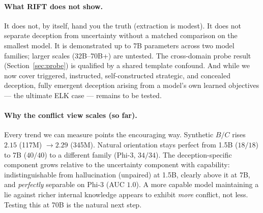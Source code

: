 \documentclass[11pt]{article}
\begin{document}
\paragraph{What RIFT does not show.} It does not, by itself, hand you the truth
(extraction is modest). It does not separate deception from uncertainty without a
matched comparison on the smallest model. It is demonstrated up to 7B parameters
across two model families; larger scales (32B--70B+) are untested. The cross-domain
probe result (Section~\ref{sec:probe}) is qualified by a shared template confound.
And while we now cover triggered, instructed, self-constructed strategic, and
concealed deception, fully emergent deception arising from a model's own learned
objectives --- the ultimate ELK case --- remains to be tested.

\paragraph{Why the conflict view scales (so far).} Every trend we can measure
points the encouraging way. Synthetic $B/C$ rises $2.15$ (117M) $\to 2.29$
(345M). Natural orientation stays perfect from 1.5B ($18/18$) to 7B ($40/40$) to
a different family (Phi-3, $34/34$). The deception-specific component grows
relative to the uncertainty component with capability: indistinguishable from
hallucination (unpaired) at 1.5B, clearly above it at 7B, and \emph{perfectly}
separable on Phi-3 (AUC $1.0$). A more capable model maintaining a lie against
richer internal knowledge appears to exhibit \emph{more} conflict, not less.
Testing this at 70B is the natural next step.
\end{document}
